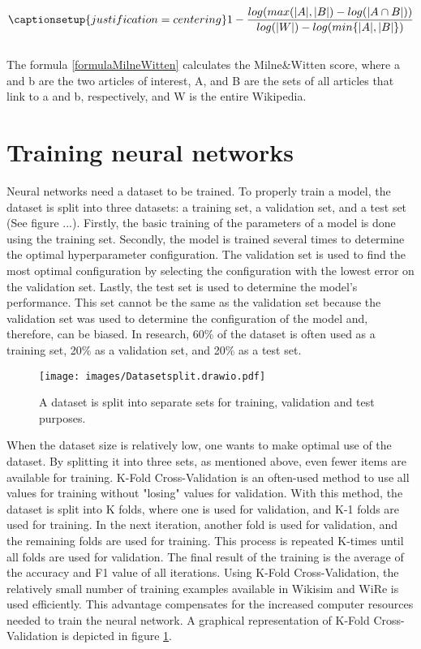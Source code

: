 \begin{equation}
\captionsetup{justification=centering}
\label{formulaMilneWitten}
1 -\frac{ log( max( |A|, | B| )-log(| A \cap B|))}{log(|W|)-log(min\{|A|, |B|\})}
\end{equation}
\\ 
The formula \ref{formulaMilneWitten} calculates the Milne\&Witten score, where a and b are the two articles of interest, A, and B are the sets of all articles that link to a and b, respectively, and W is the entire Wikipedia.

\section{Training neural networks}
\label{training}
Neural networks need a dataset to be trained. To properly train a model, the dataset is split into three datasets: a training set, a validation set, and a test set (See figure ...). Firstly, the basic training of the parameters of a model is done using the training set. Secondly, the model is trained several times to determine the optimal hyperparameter configuration. The validation set is used to find the most optimal configuration by selecting the configuration with the lowest error on the validation set. Lastly, the test set is used to determine the model's performance. This set cannot be the same as the validation set because the validation set was used to determine the configuration of the model and, therefore, can be biased. In research, 60\% of the dataset is often used as a training set, 20\% as a validation set, and 20\% as a test set.\\

\begin{figure}[h]
\centering
\captionsetup{justification=centering}
\texttt{[image: images/Datasetsplit.drawio.pdf]}
\caption{A dataset is split into separate sets for training, validation and test purposes.}
\label{imgKFold}
\end{figure}


When the dataset size is relatively low, one wants to make optimal use of the dataset. By splitting it into three sets, as mentioned above, even fewer items are available for training. K-Fold Cross-Validation is an often-used method to use all values for training without "losing" values for validation. With this method, the dataset is split into K folds, where one is used for validation, and K-1 folds are used for training. In the next iteration, another fold is used for validation, and the remaining folds are used for training. This process is repeated K-times until all folds are used for validation. The final result of the training is the average of the accuracy and F1 value of all iterations. Using K-Fold Cross-Validation, the relatively small number of training examples available in Wikisim and WiRe is used efficiently. This advantage compensates for the increased computer resources needed to train the neural network. A graphical representation of K-Fold Cross-Validation is depicted in figure \ref{imgKFold}.  
\\

